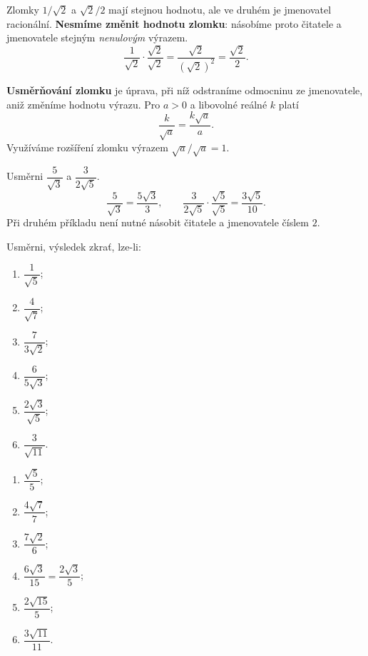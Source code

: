 \documentclass[11pt,a4paper]{article}
\begin{document}

Zlomky $1/\sqrt2$ a $\sqrt2/2$ mají stejnou hodnotu, ale ve druhém
je jmenovatel racionální. \textbf{Nesmíme změnit hodnotu zlomku}: násobíme
proto čitatele a jmenovatele stejným \emph{nenulovým} výrazem.
\[
\frac1{\sqrt2}\cdot\frac{\sqrt2}{\sqrt2}
=\frac{\sqrt2}{(\sqrt2)^2}=\boxed{\frac{\sqrt2}{2}}.
\]
\begin{definiceBox}[title={Definice - Usměrňování jmenovatele}]
\textbf{Usměrňování zlomku} je úprava, při níž odstraníme odmocninu
ze jmenovatele, aniž změníme hodnotu výrazu.
Pro $a>0$ a libovolné reálné $k$ platí
\[
\boxed{\frac{k}{\sqrt a}=\frac{k\sqrt a}{a}}.
\]
Využíváme rozšíření zlomku výrazem $\sqrt a/\sqrt a=1$.
\end{definiceBox}

\begin{prikladReseniBox}[breakable=false,title={Příklad 1}]
Usměrni $\dfrac{5}{\sqrt3}$ a $\dfrac{3}{2\sqrt5}$.
\tcblower
\[
\frac5{\sqrt3}=\frac{5\sqrt3}{3},\qquad
\frac3{2\sqrt5}\cdot\frac{\sqrt5}{\sqrt5}
=\frac{3\sqrt5}{10}.
\]
Při druhém příkladu není nutné násobit čitatele a jmenovatele číslem $2$.
\end{prikladReseniBox}

\begin{zadaniReseniBox}[breakable=false,title={Samostatná práce 1}]
Usměrni, výsledek zkrať, lze-li:
\begin{enumerate}[label=\alph*)]
\item $\dfrac1{\sqrt5}$;
\item $\dfrac4{\sqrt7}$;
\item $\dfrac7{3\sqrt2}$;
\item $\dfrac6{5\sqrt3}$;
\item $\dfrac{2\sqrt3}{\sqrt5}$;
\item $\dfrac{3}{\sqrt{11}}$.
\end{enumerate}
\tcblower
\begin{enumerate}[label=\alph*)]
\item $\dfrac{\sqrt5}{5}$;
\item $\dfrac{4\sqrt7}{7}$;
\item $\dfrac{7\sqrt2}{6}$;
\item $\dfrac{6\sqrt3}{15}=\dfrac{2\sqrt3}{5}$;
\item $\dfrac{2\sqrt{15}}5$;
\item $\dfrac{3\sqrt{11}}{11}$.
\end{enumerate}
\end{zadaniReseniBox}
\end{document}
